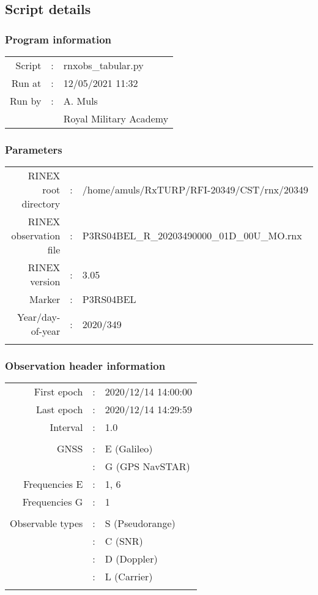 \subsection{Script details}%
\label{subsec:Scriptdetails}%
\subsubsection{Program information}%
\label{ssubsec:Programinformation}%
\setlength{\tabcolsep}{4pt}%
\begin{longtabu}[l]{rcl}%
Script&:&rnxobs\_tabular.py\\%
Run at&:&12/05/2021 11:32\\%
Run by&:&A. Muls\\%
&&Royal Military Academy\\%
\end{longtabu}

%
\subsubsection{Parameters}%
\label{ssubsec:Parameters}%
\setlength{\tabcolsep}{4pt}%
\begin{longtabu}[l]{rcl}%
RINEX root directory&:&/home/amuls/RxTURP/RFI{-}20349/CST/rnx/20349\\%
RINEX observation file&:&P3RS04BEL\_R\_20203490000\_01D\_00U\_MO.rnx\\%
RINEX version&:&3.05\\%
Marker&:&P3RS04BEL\\%
Year/day{-}of{-}year&:&2020/349\\%
&&\\%
\end{longtabu}

%
\subsubsection{Observation header information}%
\label{ssubsec:Observationheaderinformation}%
\setlength{\tabcolsep}{4pt}%
\begin{longtabu}[l]{rcl}%
First epoch&:&2020/12/14 14:00:00\\%
Last epoch&:&2020/12/14 14:29:59\\%
Interval&:&1.0\\%
&&\\%
GNSS&:&E (Galileo) \\%
&:&G (GPS NavSTAR) \\%
Frequencies E&:&1, 6\\%
Frequencies G&:&1\\%
&&\\%
Observable types&:&S (Pseudorange) \\%
&:&C (SNR) \\%
&:&D (Doppler) \\%
&:&L (Carrier) \\%
&&\\%
\end{longtabu}

